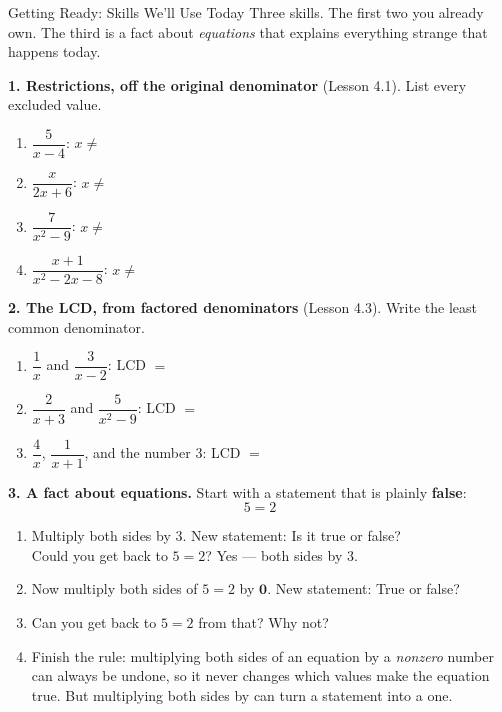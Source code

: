 \documentclass[10pt]{article}
\begin{document}
\namedateperiod

\vspace{0.10in}

\begin{notesbox}{Getting Ready: Skills We'll Use Today}
\small Three skills. The first two you already own. The third is a fact about \emph{equations} that
explains everything strange that happens today.

\vspace{4pt}
\textbf{1. Restrictions, off the original denominator} (Lesson 4.1). List every excluded value.
\begin{enumerate}[label=(\alph*), leftmargin=2.1em, itemsep=3pt]
  \item $\dfrac{5}{x-4}$: \; $x\neq$ 
  \item $\dfrac{x}{2x+6}$: \; $x\neq$ 
  \item $\dfrac{7}{x^2-9}$: \; $x\neq$ 
  \item $\dfrac{x+1}{x^2-2x-8}$: \; $x\neq$ 
\end{enumerate}

\vspace{4pt}
\textbf{2. The LCD, from factored denominators} (Lesson 4.3). Write the least common denominator.
\begin{enumerate}[label=(\alph*), leftmargin=2.1em, itemsep=3pt]
  \item $\dfrac{1}{x}$ and $\dfrac{3}{x-2}$: \quad LCD $=$ 
  \item $\dfrac{2}{x+3}$ and $\dfrac{5}{x^2-9}$: \quad LCD $=$ 
  \item $\dfrac{4}{x}$, \; $\dfrac{1}{x+1}$, \; and the number $3$: \quad LCD $=$ 
\end{enumerate}

\vspace{5pt}
\textbf{3. A fact about equations.} Start with a statement that is plainly \textbf{false}:
\[ 5 = 2 \]
\begin{enumerate}[label=(\alph*), leftmargin=2.1em, itemsep=4pt]
  \item Multiply both sides by $3$. New statement:  \; Is it true or false?
         \\[2pt]
        Could you get back to $5=2$? Yes ---  both sides by $3$.
  \item Now multiply both sides of $5=2$ by $\mathbf{0}$. New statement:  \;
        True or false? 
  \item Can you get back to $5=2$ from that?  \; Why not? 
  \item Finish the rule: multiplying both sides of an equation by a \emph{nonzero} number can always be
        undone, so it never changes which values make the equation true. But multiplying both sides by
         can turn a  statement into a  one.
\end{enumerate}
\end{notesbox}
\end{document}
